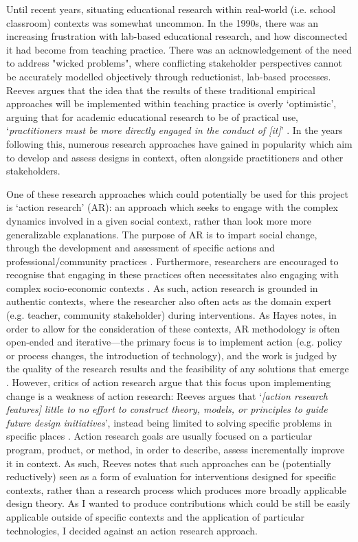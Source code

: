 Until recent years, situating educational research within real-world (i.e. school classroom) contexts was somewhat uncommon. In the 1990s, there was an increasing frustration with lab-based educational research, and how disconnected it had become from teaching practice. There was an acknowledgement of the need to address "wicked problems", where conflicting stakeholder perspectives cannot be accurately modelled objectively through reductionist, lab-based processes. Reeves argues that the idea that the results of these traditional empirical approaches will be implemented within teaching practice is overly `optimistic', arguing that for academic educational research to be of practical use, `\textit{practitioners must be more directly engaged in the conduct of [it]}' \citep{reeves2000}. In the years following this, numerous research approaches have gained in popularity which aim to develop and assess designs in context, often alongside practitioners and other stakeholders. 

One of these research approaches which could potentially be used for this project is `action research' (AR): an approach which seeks to engage with the complex dynamics involved in a given social context, rather than look more more generalizable explanations. The purpose of AR is to impart social change, through the development and assessment of specific actions and professional/community practices \citep{macdonald2012}. Furthermore, researchers are encouraged to recognise that engaging in these practices often necessitates also engaging with complex socio-economic contexts \citep{stringer2013}. As such, action research is grounded in authentic contexts, where the researcher also often acts as the domain expert (e.g. teacher, community stakeholder) during interventions. As Hayes notes, in order to allow for the consideration of these contexts, AR methodology is often open-ended and iterative---the primary focus is to implement action (e.g. policy or process changes, the introduction of technology), and the work is judged by the quality of the research results and the feasibility of any solutions that emerge \citep{hayes2011}. However, critics of action research argue that this focus upon implementing change is a weakness of action research: Reeves argues that `\textit{[action research features] little to no effort to construct theory, models, or principles to guide future design initiatives}', instead being limited to solving specific problems in specific places \citep{reeves2000}. Action research goals are usually focused on a particular program, product, or method, in order to describe, assess incrementally improve it in context. As such, Reeves notes that such approaches can be (potentially reductively) seen as a form of evaluation for interventions designed for specific contexts, rather than a research process which produces more broadly applicable design theory. As I wanted to produce contributions which could be still be easily applicable outside of specific contexts and the application of particular technologies, I decided against an action research approach.

